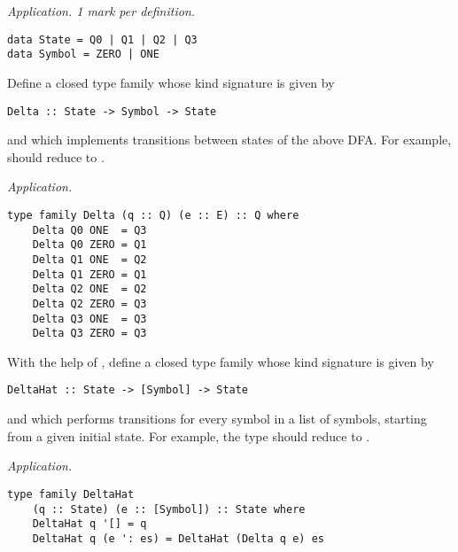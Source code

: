 \begin{parts}
\begin{subparts}
        \begin{solution}
            \emph{Application. 1 mark per definition.}
\begin{verbatim}
data State = Q0 | Q1 | Q2 | Q3 
data Symbol = ZERO | ONE
\end{verbatim}
        \end{solution}
        
        \subpart[4] Define a closed type family whose kind signature is given by
        \vspace*{0.2cm}
\begin{verbatim}
Delta :: State -> Symbol -> State
\end{verbatim}
\vspace*{0.2cm}
        and which implements transitions between states of the above DFA. For example,  should reduce to . \droppoints 
        
        \begin{solution}
            \emph{Application.}
\begin{verbatim}
type family Delta (q :: Q) (e :: E) :: Q where 
    Delta Q0 ONE  = Q3 
    Delta Q0 ZERO = Q1 
    Delta Q1 ONE  = Q2 
    Delta Q1 ZERO = Q1
    Delta Q2 ONE  = Q2 
    Delta Q2 ZERO = Q3 
    Delta Q3 ONE  = Q3 
    Delta Q3 ZERO = Q3
\end{verbatim}
        \end{solution}
    
        \subpart[4] With the help of , define a closed type family whose kind signature is given by
        \vspace*{0.2cm}
\begin{verbatim}
DeltaHat :: State -> [Symbol] -> State
\end{verbatim}
\vspace*{0.2cm}
        and which performs transitions for every symbol in a list of symbols, starting from a given initial state. For example, the type  should reduce to . \droppoints 
        
        \begin{solution}
            \emph{Application.}
\begin{verbatim}
type family DeltaHat 
    (q :: State) (e :: [Symbol]) :: State where 
    DeltaHat q '[] = q 
    DeltaHat q (e ': es) = DeltaHat (Delta q e) es
\end{verbatim}
        \end{solution}
    

\end{subparts}
\end{parts}
